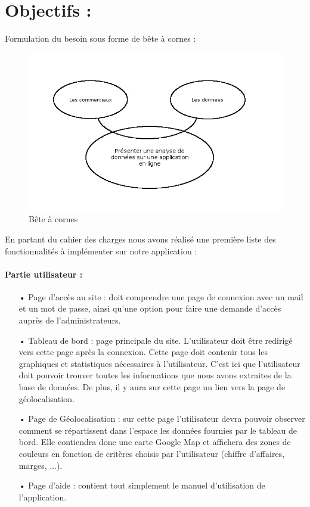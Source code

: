 \section{Objectifs :}

Formulation du besoin sous forme de bête à cornes :
\begin{figure}[h]
	\begin{center}
		\includegraphics[scale=0.5]{img/beteCornes.png}
		\caption{Bête à cornes}
	\end{center}
\end{figure}

En partant du cahier des charges nous avons réalisé une première liste des fonctionnalités à implémenter sur notre application :

\paragraph{Partie utilisateur :}
\begin{enumerate}
\item[•] Page d'accès au site : doit comprendre une page de connexion avec un mail et un mot de passe, ainsi qu'une option pour faire une demande d'accès auprès de l'administrateurs.
\item[•] Tableau de bord : page principale du site. L'utilisateur doit être redirigé vers cette page après la connexion. Cette page doit contenir tous les graphiques et statistiques nécessaires à l'utilisateur. C'est ici que l'utilisateur doit pouvoir trouver toutes les informations que nous avons extraites de la base de données. De plus, il y aura sur cette page un lien vers la page de géolocalisation.
\item[•] Page de Géolocalisation : sur cette page l'utilisateur devra pouvoir observer comment se répartissent dans l'espace les données fournies par le tableau de bord. Elle contiendra donc une carte Google Map et affichera des zones de couleurs en fonction de critères choisis par l'utilisateur (chiffre d'affaires, marges, ...).
\item[•] Page d'aide : contient tout simplement le manuel d'utilisation de l'application.
\end{enumerate}

